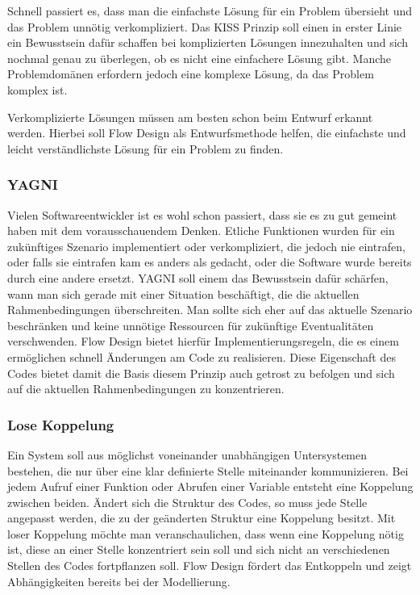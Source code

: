 Schnell passiert es, dass man die einfachste Lösung für ein Problem übersieht und das Problem unnötig verkompliziert.
Das KISS Prinzip soll einen in erster Linie ein Bewusstsein dafür schaffen bei
komplizierten Lösungen innezuhalten und sich nochmal genau zu
überlegen, ob es nicht eine einfachere Lösung gibt.
Manche Problemdomänen erfordern jedoch eine komplexe Lösung, da das Problem
komplex ist.

Verkomplizierte Lösungen müssen am besten schon beim Entwurf erkannt werden.
Hierbei soll Flow Design als Entwurfsmethode helfen, die einfachste und leicht
verständlichste Lösung für ein Problem zu finden.

\subsubsection{YAGNI}

Vielen Softwareentwickler ist es wohl schon passiert, dass sie es zu gut gemeint
haben mit dem vorausschauendem Denken. Etliche Funktionen wurden für ein
zukünftiges Szenario implementiert oder verkompliziert, die jedoch nie
eintrafen, oder falls sie eintrafen kam es anders als gedacht, oder die Software
wurde bereits durch eine andere ersetzt.
YAGNI soll einem das Bewusstsein dafür schärfen, wann man sich gerade mit einer
Situation beschäftigt, die die aktuellen Rahmenbedingungen überschreiten.
Man sollte sich eher auf das aktuelle Szenario beschränken und keine unnötige Ressourcen für zukünftige
Eventualitäten verschwenden.
Flow Design bietet hierfür Implementierungsregeln, die es einem ermöglichen
schnell Änderungen am Code zu realisieren.
Diese Eigenschaft des Codes bietet damit die Basis diesem Prinzip auch getrost
zu befolgen und sich auf die aktuellen Rahmenbedingungen zu konzentrieren.

\subsubsection{Lose Koppelung}

Ein System soll aus möglichst voneinander unabhängigen Untersystemen bestehen,
die nur über eine  klar definierte Stelle miteinander kommunizieren.
Bei jedem Aufruf einer Funktion oder Abrufen einer Variable entsteht eine
Koppelung zwischen beiden.
Ändert sich die Struktur des Codes, so muss jede Stelle angepasst werden, die zu
der geänderten Struktur eine Koppelung besitzt. Mit loser Koppelung möchte man
veranschaulichen, dass wenn eine Koppelung nötig ist, diese an einer Stelle konzentriert sein soll und
sich nicht an verschiedenen Stellen des Codes fortpflanzen soll.
Flow Design fördert das Entkoppeln und zeigt Abhängigkeiten bereits bei der Modellierung.

